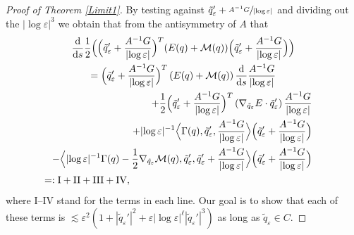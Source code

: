 \documentclass[10pt]{amsart}
\let\epsilon\varepsilon
\newcommand{\rI}{\mathrm{I}}
\newcommand{\rII}{\mathrm{II}}
\newcommand{\rIII}{\mathrm{III}}
\newcommand{\rIV}{\mathrm{IV}}
\theoremstyle{definition}
\let\eps\epsilon
\let\mel\relax
\begin{document}
\begin{proof}[Proof of Theorem \ref{Limit1}]
By testing against $\tilde{q}_\eps'+\sfrac{A^{-1}G}{|{\log\eps}|}$ and dividing out the $|{\log\eps}|^3$ we obtain that from the antisymmetry of $A$ that\vspace*{-5pt}
\begin{multline}\label{mod energy}
\mel\frac{\text{d}}{\text{d}s}\frac{1}{2} \Bigl(\Bigl(\tilde{q}_\eps'+\frac{A^{-1}G}{|{\log\eps}|} \Bigr)^T(E(q)+\mathcal{M}(q)) \Bigl(\tilde{q}_\eps'+\frac{A^{-1}G}{|{\log\eps}|} \Bigr) \Bigr)\\
= \Bigl(\tilde{q}_\eps'+\frac{A^{-1}G}{|{\log\eps}|} \Bigr)^T\left(E(q)+\mathcal{M}(q)\right)\frac{\text{d}}{\text{d}s}\frac{A^{-1}G}{|{\log\eps}|}\\
\shoveright{+\frac{1}{2} \Bigl(\tilde{q}_\eps'+\frac{A^{-1}G}{|{\log\eps}|} \Bigr)^T\left(\nabla_{\tilde{q}_\eps}E\cdot\tilde{q}_\eps'\right)\frac{A^{-1}G}{|{\log\eps}|}}\\
\shoveright{+|{\log\eps}|^{-1} \Bigl\langle \Gamma(q),\tilde{q}_\eps',\frac{A^{-1}G}{|{\log\eps}|} \Bigr\rangle \Bigl(\tilde{q}_\eps'+\frac{A^{-1}G}{|{\log\eps}|} \Bigr)}\\
\shoveright{-\Bigl\langle|{\log\eps}|^{-1} \Gamma(q)-\frac{1}{2}\nabla_{\tilde{q}_\eps}\mathcal{M}(q),\tilde{q}_\eps',\tilde{q}_\eps'+\frac{A^{-1}G}{|{\log\eps}|} \Bigr\rangle \Bigl(\tilde{q}_\eps'+\frac{A^{-1}G}{|{\log\eps}|} \Bigr)}\\
=: \rI+\rII+\rIII+\rIV,\hspace*{6.85cm}
\end{multline}
where $\rI$--$\rIV$ stand for the terms in each line. Our goal is to show that each of these terms is $\lesssim \eps^2(1+|\tilde{q}_\eps'|^2+\eps|{\log\eps}|^\ell|\tilde{q}_\eps'|^3)$ as long as $\tilde{q}_\eps\in C$.


\end{proof}
\end{document}
